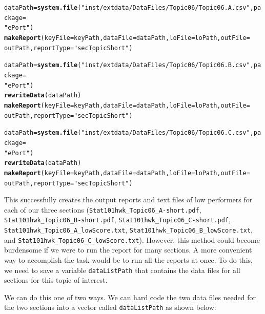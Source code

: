 \documentclass[11pt,a4paper,oldfontcommands,openany]{memoir}
\makeatletter
\newcommand{\hlstr}[1]{\textcolor[rgb]{0.192,0.494,0.8}{#1}}%
\newcommand{\hlstd}[1]{\textcolor[rgb]{0.345,0.345,0.345}{#1}}%
\newcommand{\hlkwb}[1]{\textcolor[rgb]{0.69,0.353,0.396}{#1}}%
\newcommand{\hlkwc}[1]{\textcolor[rgb]{0.333,0.667,0.333}{#1}}%
\newcommand{\hlkwd}[1]{\textcolor[rgb]{0.737,0.353,0.396}{\textbf{#1}}}%
\newenvironment{kframe}{%
 \def\at@end@of@kframe{}%
 \ifinner\ifhmode%
  \def\at@end@of@kframe{\end{minipage}}%
  \begin{minipage}{\columnwidth}%
 \fi\fi%
 \def\FrameCommand##1{\hskip\@totalleftmargin \hskip-\fboxsep
 \colorbox{shadecolor}{##1}\hskip-\fboxsep
     \hskip-\linewidth \hskip-\@totalleftmargin \hskip\columnwidth}%
 \MakeFramed {\advance\hsize-\width
   \@totalleftmargin\z@ \linewidth\hsize
   \@setminipage}}%
 {\par\unskip\endMakeFramed%
 \at@end@of@kframe}
\newenvironment{knitrout}{}{} %
\numberwithin{equation}{section} %
\makeatother
\begin{document}
\begin{knitrout}
\color{fgcolor}\begin{kframe}
\begin{alltt}
\hlstd{dataPath} \hlkwb{=} \hlkwd{system.file}\hlstd{(}\hlstr{"inst/extdata/DataFiles/Topic06/Topic06.A.csv"}\hlstd{,} \hlkwc{package} \hlstd{=}
  \hlstr{"ePort"}\hlstd{)}
\hlkwd{makeReport}\hlstd{(}\hlkwc{keyFile} \hlstd{= keyPath,} \hlkwc{dataFile} \hlstd{= dataPath,} \hlkwc{loFile} \hlstd{= loPath,} \hlkwc{outFile} \hlstd{=}
  \hlstd{outPath,} \hlkwc{reportType} \hlstd{=} \hlstr{"secTopicShort"}\hlstd{)}

\hlstd{dataPath} \hlkwb{=} \hlkwd{system.file}\hlstd{(}\hlstr{"inst/extdata/DataFiles/Topic06/Topic06.B.csv"}\hlstd{,} \hlkwc{package} \hlstd{=}
  \hlstr{"ePort"}\hlstd{)}
\hlkwd{rewriteData}\hlstd{(dataPath)}
\hlkwd{makeReport}\hlstd{(}\hlkwc{keyFile} \hlstd{= keyPath,} \hlkwc{dataFile} \hlstd{= dataPath,} \hlkwc{loFile} \hlstd{= loPath,} \hlkwc{outFile} \hlstd{=}
  \hlstd{outPath,} \hlkwc{reportType} \hlstd{=} \hlstr{"secTopicShort"}\hlstd{)}

\hlstd{dataPath} \hlkwb{=} \hlkwd{system.file}\hlstd{(}\hlstr{"inst/extdata/DataFiles/Topic06/Topic06.C.csv"}\hlstd{,} \hlkwc{package} \hlstd{=}
  \hlstr{"ePort"}\hlstd{)}
\hlkwd{rewriteData}\hlstd{(dataPath)}
\hlkwd{makeReport}\hlstd{(}\hlkwc{keyFile} \hlstd{= keyPath,} \hlkwc{dataFile} \hlstd{= dataPath,} \hlkwc{loFile} \hlstd{= loPath,} \hlkwc{outFile} \hlstd{=}
  \hlstd{outPath,} \hlkwc{reportType} \hlstd{=} \hlstr{"secTopicShort"}\hlstd{)}
\end{alltt}
\end{kframe}
\end{knitrout}

This successfully creates the output reports and text files of low performers for each of our three sections (\texttt{Stat101hwk\_Topic06\_A\--short.pdf}, \texttt{Stat101hwk\_Topic06\_B\--short.pdf}, \texttt{Stat101hwk\_Topic06\_C\--short.pdf}, \texttt{Stat101hwk\_Topic06\_A\_lowScore.txt}, \texttt{Stat101hwk\_Topic06\_B\_lowScore.txt}, and \texttt{Stat101hwk\_Topic06\_C\_lowScore.txt}). However, this method could become burdensome if we were to run the report for many sections. A more convenient way to accomplish the task would be to run all the reports at once. To do this, we need to save a variable \texttt{dataListPath} that contains the data files for all sections for this topic of interest.

We can do this one of two ways. We can hard code the two data files needed for the two sections into a vector called \texttt{dataListPath} as shown below: \\
\end{document}
